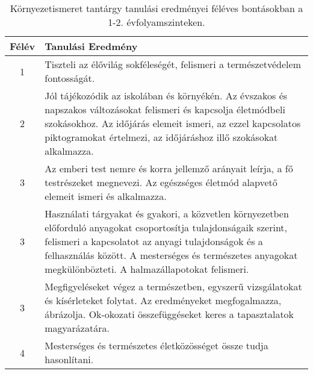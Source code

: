        
           \begin{longtable}{c | p{} }
            \caption[Környezetismeret 1-2.]{Környezetismeret tantárgy tanulási eredményei féléves bontásokban a 1-2. évfolyamszinteken. }  \\

            \textbf{Félév} & \textbf{Tanulási Eredmény} \\
            \hline
            \endhead
                                
                                          1 &  Tiszteli az élővilág sokféleségét, felismeri a természetvédelem fontosságát. \\ \hline
                                      
                                
                                          2 &  Jól tájékozódik az iskolában és környékén. Az évszakos és napszakos változásokat felismeri és kapcsolja életmódbeli szokásokhoz. Az időjárás elemeit ismeri, az ezzel kapcsolatos piktogramokat értelmezi, az időjáráshoz illő szokásokat alkalmazza. \\ \hline
                                      
                                
                                          3 &  Az emberi test nemre és korra jellemző arányait leírja, a fő testrészeket megnevezi. Az egészséges életmód alapvető elemeit ismeri és alkalmazza. \\ \hline
                                          3 &  Használati tárgyakat és gyakori, a közvetlen környezetben előforduló anyagokat csoportosítja tulajdonságaik szerint, felismeri a kapcsolatot az anyagi tulajdonságok és a felhasználás között. A mesterséges és természetes anyagokat megkülönbözteti. A halmazállapotokat felismeri. \\ \hline
                                          3 &  Megfigyeléseket végez a természetben, egyszerű vizsgálatokat és kísérleteket  folytat. Az eredményeket megfogalmazza, ábrázolja. Ok-okozati összefüggéseket keres a tapasztalatok magyarázatára. \\ \hline
                                      
                                
                                          4 &  Mesterséges és természetes életközösséget össze tudja hasonlítani. \\ \hline
                                      
                        \end{longtable}
            \clearpage

